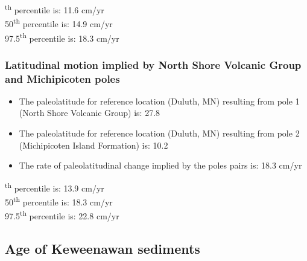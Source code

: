 \documentclass{article}
\begin{document}
\textsuperscript{th} percentile is: 11.6 cm/yr\\
50\textsuperscript{th} percentile is: 14.9 cm/yr\\
97.5\textsuperscript{th} percentile is: 18.3 cm/yr\\
    
\newpage

\subsubsection{Latitudinal motion implied by North Shore Volcanic Group and Michipicoten poles}\label{MamainseMichipicotenRate}

\begin{itemize}
\item{The paleolatitude for reference location (Duluth, MN) resulting from pole 1 (North Shore Volcanic Group) is: 27.8\textdegree}
\item{The paleolatitude for reference location (Duluth, MN) resulting from pole 2 (Michipicoten Island Formation) is: 10.2\textdegree}
\item{The rate of paleolatitudinal change implied by the poles pairs is: 18.3 cm/yr}
\end{itemize}

    \begin{center}
    \end{center}
    
    \begin{figure}[h]
    \centering
    \end{figure}
    
\textsuperscript{th} percentile is: 13.9 cm/yr\\
50\textsuperscript{th} percentile is: 18.3 cm/yr\\
97.5\textsuperscript{th} percentile is: 22.8 cm/yr\\

\newpage


    
    \subsection{Age of Keweenawan
sediments}\label{age-of-keweenawan-sediments}
\end{document}

